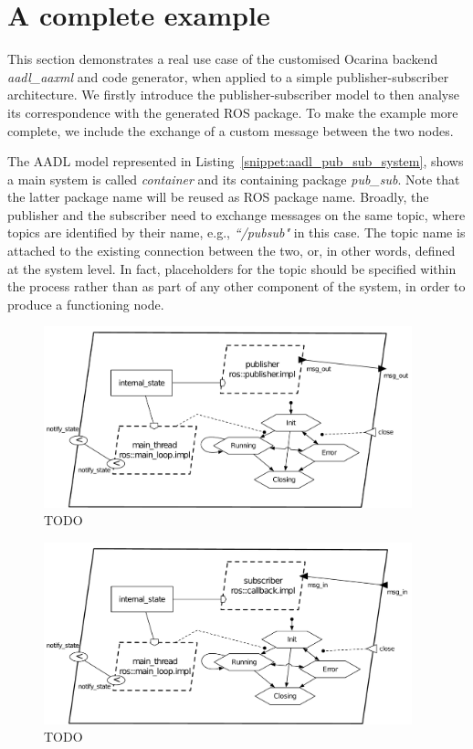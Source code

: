 \section{A complete example}

This section demonstrates a real use case of the customised Ocarina backend \textit{aadl\_aaxml} and code generator, when applied to a simple publisher-subscriber architecture. We firstly introduce the publisher-subscriber model to then analyse its correspondence with the generated ROS package. To make the example more complete, we include the exchange of a custom message between the two nodes.

The AADL model represented in Listing~\ref{snippet:aadl_pub_sub_system}, shows a main system is called \textit{container} and its containing package \textit{pub\_sub}. Note that the latter package name will be reused as ROS package name. Broadly, the publisher and the subscriber need to exchange messages on the same topic, where topics are identified by their name, e.g.,  \textit{``/pubsub"} in this case. The topic name is attached to the existing connection between the two, or, in other words, defined at the system level. In fact, placeholders for the topic should be specified within the process rather than as part of any other component of the system, in order to produce a functioning node.

\begin{figure}[t]
\centering
\includegraphics[width=0.95\textwidth]{gfx/usecase-publisher}
\caption{TODO}\label{fig:usecase-publisher}
\end{figure}

\begin{figure}[t]
\centering
\includegraphics[width=0.95\textwidth]{gfx/usecase-subscriber}
\caption{TODO}\label{fig:usecase-subscriber}
\end{figure}


